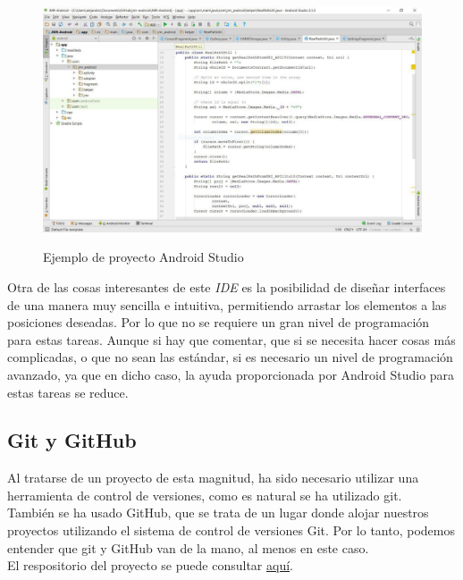 \begin{figure}[H] %
\centering
\includegraphics[scale=0.5]{imagenes/android-studio.jpg}  %
\label{android-studio.jpg}
\caption{Ejemplo de proyecto Android Studio}
\end{figure}

Otra de las cosas interesantes de este \textit{IDE} es la posibilidad de diseñar interfaces de una manera muy sencilla e intuitiva, permitiendo arrastar los elementos a las posiciones deseadas. Por lo que no se requiere un gran nivel de programación para estas tareas. Aunque si hay que comentar, que si se necesita hacer cosas más complicadas, o que no sean las estándar, si es necesario un nivel de programación avanzado, ya que en dicho caso, la ayuda proporcionada por Android Studio para estas tareas se reduce.\\ 

\subsection{Git y GitHub}

Al tratarse de un proyecto de esta magnitud, ha sido necesario utilizar una herramienta de control de versiones, como es natural se ha utilizado git.\\

También se ha usado GitHub, que se trata de un lugar donde alojar nuestros proyectos utilizando el sistema de control de versiones Git. Por lo tanto, podemos entender que git y GitHub van de la mano, al menos en este caso.\\

El respositorio del proyecto se puede consultar \href{https://github.com/acasadoquijada/jmr-android}{aquí}.

